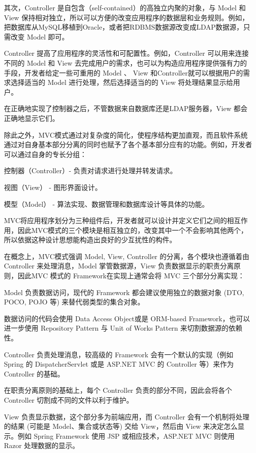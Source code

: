 其次，Controller 是自包含（self-contained）的高独立内聚的对象，与 Model 和 View 保持相对独立，所以可以方便的改变应用程序的数据层和业务规则。例如，把数据库从MySQL移植到Oracle，或者把RDBMS数据源改变成LDAP数据源，只需改变 Model 即可。

Controller 提高了应用程序的灵活性和可配置性。例如，Controller 可以用来连接不同的 Model 和 View 去完成用户的需求，也可以为构造应用程序提供强有力的手段，开发者给定一些可重用的 Model 、 View 和Controller就可以根据用户的需求选择适当的 Model 进行处理，然后选择适当的的 View 将处理结果显示给用户。

在正确地实现了控制器之后，不管数据来自数据库还是LDAP服务器，View 都会正确地显示它们。

除此之外，MVC模式通过对复杂度的简化，使程序结构更加直观，而且软件系统通过对自身基本部分分离的同时也赋予了各个基本部分应有的功能。例如，开发者可以通过自身的专长分组：

\begin{compactitem}
\item 控制器（Controller）- 负责对请求进行处理并转发请求。
\item 视图（View） - 图形界面设计。
\item 模型（Model） - 算法实现、数据管理和数据库设计等具体的功能。
\end{compactitem}

MVC将应用程序划分为三种组件后，开发者就可以设计并定义它们之间的相互作用，因此MVC模式的三个模块是相互独立的，改变其中一个不会影响其他两个，所以依据这种设计思想能构造出良好的少互扰性的构件。

在概念上，MVC模式强调 Model, View, Controller 的分离，各个模块也遵循着由 Controller 来处理消息，Model 掌管数据源，View 负责数据显示的职责分离原则，因此MVC 模式的 Framework在实现上通常会将 MVC 三个部分分离实现：

\begin{compactitem}
\item Model 负责数据访问，现代的 Framework 都会建议使用独立的数据对象 (DTO, POCO, POJO 等) 来替代弱类型的集合对象。

数据访问的代码会使用 Data Access Object或是 ORM-based Framework，也可以进一步使用 Repository Pattern 与 Unit of Works Pattern 来切割数据源的依赖性。

\item Controller 负责处理消息，较高级的 Framework 会有一个默认的实现（例如Spring 的 DispatcherServlet 或是 ASP.NET MVC 的 Controller 等）来作为 Controller 的基础。

在职责分离原则的基础上，每个 Controller 负责的部分不同，因此会将各个 Controller 切割成不同的文件以利于维护。

\item View 负责显示数据，这个部分多为前端应用，而 Controller 会有一个机制将处理的结果 (可能是 Model、集合或状态等) 交给 View，然后由 View 来决定怎么显示。例如 Spring Framework 使用 JSP 或相应技术，ASP.NET MVC 则使用 Razor 处理数据的显示。


\end{compactitem}


